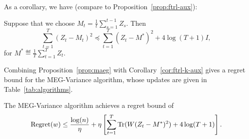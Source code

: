 \documentclass[paper_icml.tex]{subfiles}
\begin{document}
As a corollary, we have (compare to Proposition~\ref{prop:ftrl-aux}):
\begin{corollary}
\label{cor:ftrl-k-aux}
Suppose that we choose $M_t = \frac{1}{t} \sum_{s=1}^{t-1} Z_s$. Then
\[ \sum_{t=1}^T (Z_t - M_t)^2 \preceq \sum_{t=1}^T (Z_t - M^*)^2 + 4\log(T+1)I, \]
for $M^* \eqdef \frac{1}{T} \sum_{t=1}^T Z_t$.
\end{corollary}
Combining Proposition~\ref{prop:maeg} with Corollary~\ref{cor:ftrl-k-aux} gives a 
regret bound for the MEG-Variance algorithm, whose updates are given in 
Table~\ref{tab:algorithms}.
\begin{corollary}
\label{cor:maeg-variance}
The MEG-Variance algorithm achieves a regret bound of
\[ \operatorname{Regret}(w) \leq \frac{\log(n)}{\eta} + \eta \left[ \sum_{t=1}^T \operatorname{Tr}(W(Z_t-M^*)^2) + 4\log(T+1) \right]. \]
\end{corollary}
\end{document}
